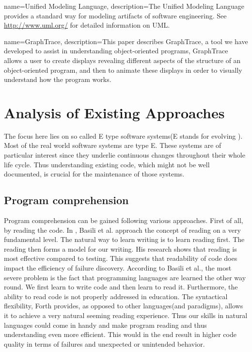 {
  name={Unified Modeling Language},
  description={The Unified Modeling Language provides a standard way for modeling artifacts of software engineering. See \url{http://www.uml.org/} for detailed information on UML.}
}

{
  name={GraphTrace},
  description={This paper describes GraphTrace, a tool we have developed to assist in understanding object-oriented programs, GraphTrace allows a user to create displays revealing different aspects of the structure of an object-oriented program, and then to animate these displays in order to visually understand how the program works.}
}

\chapter{Analysis of Existing Approaches}
\label{chap:StateOfTheArt}

The focus here lies on so called E type software systems(E stands for evolving \cite{Cook:2006:ESS:1115566.1115567}). Most of the real world software systems are type E. These systems are of particular interest since they underlie continuous changes throughout their whole life cycle. Thus understanding existing code, which might not be well documented, is crucial for the maintenance of those systems.

\section{Program comprehension}

Program comprehension can be gained following various approaches. First of all, by reading the code.
In \cite{Basili:1997:EPR:257260.257262}, Basili et al. approach the concept of reading on a very fundamental level. The natural way to learn writing is to learn reading first. The reading then forms a model for our writing.  His research shows that reading is most effective compared to testing. This suggests that readability of code does impact the efficiency of failure discovery. According to Basili et al., the most severe problem is the fact that programming languages are learned the other way round. We first learn to write code and then learn to read it. Furthermore, the ability to read code is not properly addressed in education. The syntactical flexibility, Forth provides, as opposed to other languages(and paradigms), allows it to achieve a very natural seeming reading experience. Thus our skills in natural languages could come in handy and make program reading and thus understanding even more efficient. This would in the end result in higher code quality in terms of failures and unexpected or unintended behavior.

